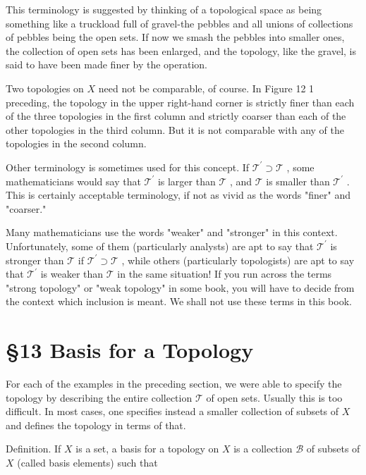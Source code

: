 \documentclass[10pt]{article}
\begin{document}
This terminology is suggested by thinking of a topological space as being something like a truckload full of gravel-the pebbles and all unions of collections of pebbles being the open sets. If now we smash the pebbles into smaller ones, the collection of open sets has been enlarged, and the topology, like the gravel, is said to have been made finer by the operation.

Two topologies on \(X\) need not be comparable, of course. In Figure 12 1 preceding, the topology in the upper right-hand corner is strictly finer than each of the three topologies in the first column and strictly coarser than each of the other topologies in the third column. But it is not comparable with any of the topologies in the second column.

Other terminology is sometimes used for this concept. If \({\mathcal{T}}^{\prime } \supset  \mathcal{T}\) , some mathematicians would say that \({\mathcal{T}}^{\prime }\) is larger than \(\mathcal{T}\) , and \(\mathcal{T}\) is smaller than \({\mathcal{T}}^{\prime }\) . This is certainly acceptable terminology, if not as vivid as the words "finer" and "coarser."

Many mathematicians use the words "weaker" and "stronger" in this context. Unfortunately, some of them (particularly analysts) are apt to say that \({\mathcal{T}}^{\prime }\) is stronger than \(\mathcal{T}\) if \({\mathcal{T}}^{\prime } \supset  \mathcal{T}\) , while others (particularly topologists) are apt to say that \({\mathcal{T}}^{\prime }\) is weaker than \(\mathcal{T}\) in the same situation! If you run across the terms "strong topology" or "weak topology" in some book, you will have to decide from the context which inclusion is meant. We shall not use these terms in this book.

\section*{§13 Basis for a Topology}

For each of the examples in the preceding section, we were able to specify the topology by describing the entire collection \(\mathcal{T}\) of open sets. Usually this is too difficult. In most cases, one specifies instead a smaller collection of subsets of \(X\) and defines the topology in terms of that.

Definition. If \(X\) is a set, a basis for a topology on \(X\) is a collection \(\mathcal{B}\) of subsets of \(X\) (called basis elements) such that
\end{document}
